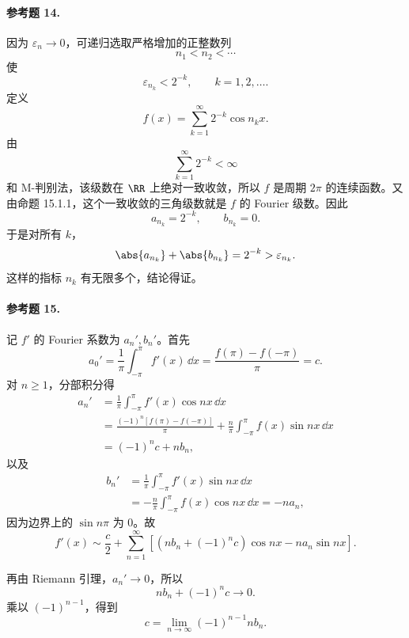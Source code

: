 \paragraph{参考题 14.}
\begin{xsolution}
因为 $\varepsilon_n\to0$，可递归选取严格增加的正整数列
\[
  n_1<n_2<\cdots
\]
使
\[
  \varepsilon_{n_k}<2^{-k},\qquad k=1,2,\ldots.
\]
定义
\[
  f(x)=\sum_{k=1}^{\infty}2^{-k}\cos n_kx.
\]
由
\[
  \sum_{k=1}^{\infty}2^{-k}<\infty
\]
和 M-判别法，该级数在 $\RR$ 上绝对一致收敛，所以 $f$ 是周期 $2\pi$ 的连续函数。又由命题 15.1.1，这个一致收敛的三角级数就是 $f$ 的 Fourier 级数。因此
\[
  a_{n_k}=2^{-k},\qquad b_{n_k}=0.
\]
于是对所有 $k$，
\[
  \abs{a_{n_k}}+\abs{b_{n_k}}
  =2^{-k}>\varepsilon_{n_k}.
\]
这样的指标 $n_k$ 有无限多个，结论得证。
\end{xsolution}

\paragraph{参考题 15.}
\begin{xsolution}
记 $f'$ 的 Fourier 系数为 $a_n',b_n'$。首先
\[
  a_0'=\frac1\pi\int_{-\pi}^{\pi}f'(x)\,\dd x
  =\frac{f(\pi)-f(-\pi)}{\pi}=c.
\]
对 $n\ge1$，分部积分得
\begin{align*}
  a_n'
  &=\frac1\pi\int_{-\pi}^{\pi}f'(x)\cos nx\,\dd x\\
  &=\frac{(-1)^n[f(\pi)-f(-\pi)]}{\pi}
    +\frac n\pi\int_{-\pi}^{\pi}f(x)\sin nx\,\dd x\\
  &=(-1)^nc+nb_n,
\end{align*}
以及
\begin{align*}
  b_n'
  &=\frac1\pi\int_{-\pi}^{\pi}f'(x)\sin nx\,\dd x\\
  &=-\frac n\pi\int_{-\pi}^{\pi}f(x)\cos nx\,\dd x
  =-na_n,
\end{align*}
因为边界上的 $\sin n\pi$ 为 $0$。故
\[
  \boxed{\displaystyle
  f'(x)\sim\frac c2+
  \sum_{n=1}^{\infty}
  [(nb_n+(-1)^nc)\cos nx-na_n\sin nx]}.
\]

再由 Riemann 引理，$a_n'\to0$，所以
\[
  nb_n+(-1)^nc\to0.
\]
乘以 $(-1)^{n-1}$，得到
\[
  \boxed{\displaystyle
  c=\lim_{n\to\infty}(-1)^{n-1}nb_n }.
\]
\end{xsolution}

